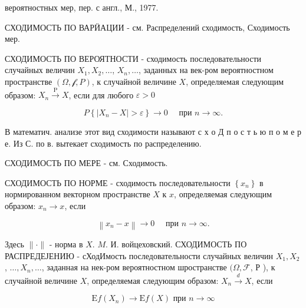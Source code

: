 \documentclass[10pt]{article}
\begin{document}
вероятностных мер, пер. с англ., М., 1977.



СХОДИМОСТЬ ПО ВАРӤАЦИИ - см. Распределений сходимость, Сходимость мер.



СХОДИМОСТЬ ПО ВЕРОЯТНОСТИ - сходимость последовательности случайных величин $X_{1}, X_{2}, \ldots$, $X_{n}, \ldots$, заданных на век-ром вероятностном пространстве $(\Omega, \mathscr{f}, P)$, к случайной величине $X$, определяемая следующим образом: $X_{n} \stackrel{\mathrm{P}}{\longrightarrow} X$, если для любого $\varepsilon>0$



\[

P\left\{\left|X_{n}-X\right|>\varepsilon\right\} \longrightarrow 0 \quad \text { при } n \longrightarrow \infty .

\]



В математич. анализе этот вид сходимости называют с х о Д п о с т ь ю п о м е р е. Из С. по в. вытекает сходимость по распределению.



СХОДИМОСТЬ ПО МЕРЕ - см. Сходимость.



СХОДИМОСТЬ ПО НОРМЕ - сходимость последовательности $\left\{x_{n}\right\}$ в нормированном векторном пространстве $X$ к $x$, определяемая следующим образом: $x_{n} \rightarrow x$, если



\[

\left\|x_{n}-x\right\| \rightarrow 0 \quad \text { при } n \longrightarrow \infty .

\]



Здесь $\|\cdot\|$ - норма в $X$. $M$. И. войцеховский. СХОДИМОСТЬ ПО РАСПРЕДЕЈЕНИЮ - сХодИмость последовательности случайных величин $X_{1}, X_{2}$, $\ldots, X_{n}, \ldots$, заданная на нек-ром вероятностном шространстве $(\Omega, \mathscr{F}$, Р ), к случайной величине $X$, определяемая следующим образом: $X_{n} \stackrel{d}{\longrightarrow} X$, если



\[

\mathrm{E} f\left(X_{n}\right) \longrightarrow \mathrm{E} f(X) \text { при } n \longrightarrow \infty

\]
\end{document}
